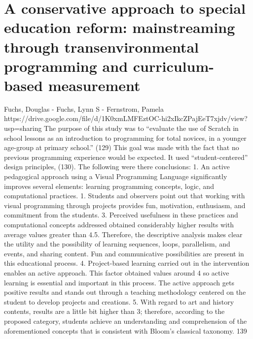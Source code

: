 \documentclass[12pt]{extarticle}
\begin{document}
\section{A conservative approach to special education reform: mainstreaming through transenvironmental programming and curriculum-based measurement}
Fuchs, Douglas - Fuchs, Lynn S - Fernstrom, Pamela
https://drive.google.com/file/d/1K0xmLMFEztOC-hi2xIkcZPajEeT7xjdv/view?usp=sharing 
The purpose of this study was to “evaluate the use of Scratch in school lessons as an introduction to programming for total novices, in a younger age-group at primary school.” (129) This goal was made with the fact that no previous programming experience would be expected. It used “student-centered” design principles, (130). The following were there conclusions: 1. An active pedagogical approach using a Visual Programming Language significantly improves several elements: learning programming concepts, logic, and computational practices. 1. Students and observers point out that working with visual programming through projects provides fun, motivation, enthusiasm, and commitment from the students. 3. Perceived usefulness in these practices and computational concepts addressed obtained considerably higher results with average values greater than 4.5. Therefore, the descriptive analysis makes clear the utility and the possibility of learning sequences, loops, parallelism, and events, and sharing content. Fun and communicative possibilities are present in this educational process. 4. Project-based learning carried out in the intervention enables an active approach. This factor obtained values around 4 so active learning is essential and important in this process. The active approach gets positive results and stands out through a teaching methodology centered on the student to develop projects and creations. 5. With regard to art and history contents, results are a little bit higher than 3; therefore, according to the proposed category, students achieve an understanding and comprehension of the aforementioned concepts that is consistent with Bloom’s classical taxonomy. 139
\end{document}

